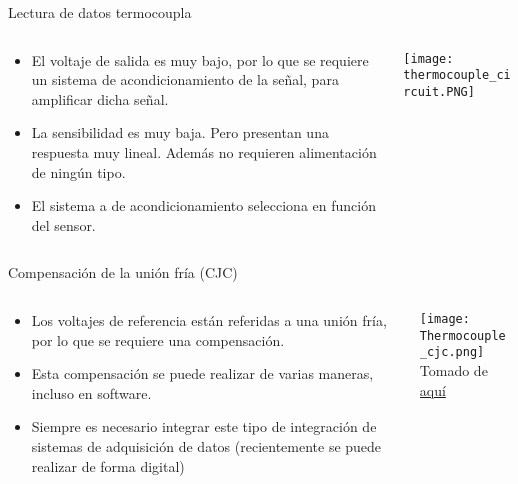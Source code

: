 \documentclass[aspectratio=169]{beamer}
\begin{document}
\begin{frame}{Lectura de datos termocoupla}
 \begin{columns}[c, onlytextwidth]
        \begin{column}{0.45\textwidth}
            \begin{itemize}
                \item El voltaje de salida es muy bajo, por lo que se requiere un sistema de acondicionamiento de la señal, para amplificar dicha señal.  
                \item La sensibilidad es muy baja. Pero presentan una respuesta muy lineal. Además no requieren alimentación de ningún tipo.
                \item El sistema a de acondicionamiento selecciona en función del sensor. 
                
            \end{itemize}
        \end{column}
        \begin{column}{0.5\textwidth}
            \texttt{[image: thermocouple\_circuit.PNG]}
            \\ \cite{Fraden_2016}
        \end{column}
    \end{columns}
\end{frame}
\begin{frame}{Compensación de la unión fría (CJC)}
 \begin{columns}[c, onlytextwidth]
        \begin{column}{0.45\textwidth}
            \begin{itemize}
                \item Los voltajes de referencia están referidas a una unión fría, por lo que se requiere una compensación.  
                \item Esta compensación se puede realizar de varias maneras, incluso en software. 
                \item Siempre es necesario integrar este tipo de integración de sistemas de adquisición de datos (recientemente se puede realizar de forma digital)
            \end{itemize}
        \end{column}
        \begin{column}{0.5\textwidth}
            \texttt{[image: Thermocouple\_cjc.png]}
            \\ \tiny{Tomado de \href{https://forumautomation.com/t/what-is-cold-junction-compensation-in-thermocouple/2896}{aquí}}
        \end{column}
    \end{columns}
\end{frame}
\end{document}
